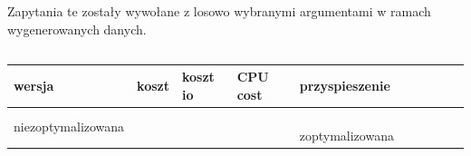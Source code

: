 \documentclass[11pt]{article}
\numberwithin{figure}{subsection}
\begin{document}
		\begin{tabularx}{\textwidth}{|X|X|X|X|X|X|}
		\end{tabularx}
		
		\begin{tabularx}{\textwidth}{|X|X|X|X|X|X|}
		\end{tabularx}
		

		
		
		
		
		
		
		
		
		
		
	
	\subsection{}
			
		\begin{lstlisting}[caption={Wersja niezoptymalizowana},captionpos=b]
		\end{lstlisting}
			
		\begin{lstlisting}[caption={Wersja zoptymalizowana},captionpos=b]
		\end{lstlisting}
		
		Zapytania te zostały wywołane z losowo wybranymi argumentami w ramach
		wygenerowanych danych. \\
		
		\begin{lstlisting}[caption={Wywołanie zapytań}, captionpos=b]
		\end{lstlisting}
		
		\begin{tabularx}{\textwidth}{|X|X|X|X|X|}
			\hline
			wersja & koszt & koszt io & CPU cost & przyspieszenie \\
			\hline
			niezoptymalizowana &  &  &  &  \
			\hline
			zoptymalizowana &  &  &  &  \
			\hline
		\end{tabularx}
		
		\begin{tabularx}{\textwidth}{|X|X|X|X|X|X|}
		\end{tabularx}
		
		\begin{tabularx}{\textwidth}{|X|X|X|X|X|X|}
		\end{tabularx}
		

		
		
		
		
		
		
		

\newpage
\printbibliography
\end{document}

